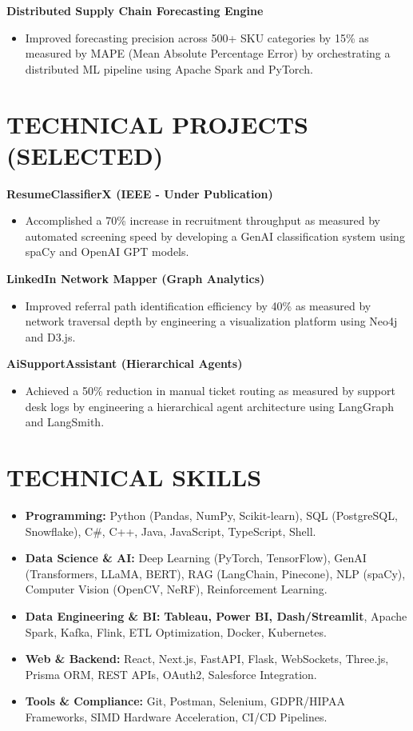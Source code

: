 \documentclass[10pt, a4paper]{article}
\begin{document}
\textbf{Distributed Supply Chain Forecasting Engine}
\begin{itemize}
    \item Improved forecasting precision across 500+ SKU categories by 15\% as measured by MAPE (Mean Absolute Percentage Error) by orchestrating a distributed ML pipeline using Apache Spark and PyTorch.
\end{itemize}

\section{TECHNICAL PROJECTS (SELECTED)}

\textbf{ResumeClassifierX (IEEE - Under Publication)}
\begin{itemize}
    \item Accomplished a 70\% increase in recruitment throughput as measured by automated screening speed by developing a GenAI classification system using spaCy and OpenAI GPT models.
\end{itemize}

\textbf{LinkedIn Network Mapper (Graph Analytics)}
\begin{itemize}
    \item Improved referral path identification efficiency by 40\% as measured by network traversal depth by engineering a visualization platform using Neo4j and D3.js.
\end{itemize}

\textbf{AiSupportAssistant (Hierarchical Agents)}
\begin{itemize}
    \item Achieved a 50\% reduction in manual ticket routing as measured by support desk logs by engineering a hierarchical agent architecture using LangGraph and LangSmith.
\end{itemize}

\section{TECHNICAL SKILLS}
\begin{itemize}[label=]
    \item \textbf{Programming:} Python (Pandas, NumPy, Scikit-learn), SQL (PostgreSQL, Snowflake), C\#, C++, Java, JavaScript, TypeScript, Shell.
    \item \textbf{Data Science \& AI:} Deep Learning (PyTorch, TensorFlow), GenAI (Transformers, LLaMA, BERT), RAG (LangChain, Pinecone), NLP (spaCy), Computer Vision (OpenCV, NeRF), Reinforcement Learning.
    \item \textbf{Data Engineering \& BI:} \textbf{Tableau, Power BI, Dash/Streamlit}, Apache Spark, Kafka, Flink, ETL Optimization, Docker, Kubernetes.
    \item \textbf{Web \& Backend:} React, Next.js, FastAPI, Flask, WebSockets, Three.js, Prisma ORM, REST APIs, OAuth2, Salesforce Integration.
    \item \textbf{Tools \& Compliance:} Git, Postman, Selenium, GDPR/HIPAA Frameworks, SIMD Hardware Acceleration, CI/CD Pipelines.
\end{itemize}
\end{document}
